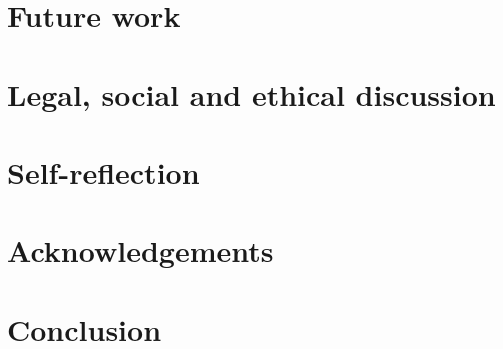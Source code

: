 \documentclass[a4paper]{article}
\begin{document}
    \section{Future work}
    \section{Legal, social and ethical discussion}
    \section{Self-reflection}
    \section{Acknowledgements}
    \section{Conclusion}
\end{document}
